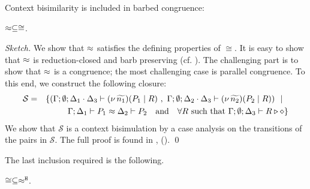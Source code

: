 Context bisimilarity is included in barbed congruence:
\begin{lemma}
	\label{lem:wbc_is_cong}
	$\approx \subseteq \cong$.
\end{lemma}

\begin{proof}[Sketch]
	We show that $\approx$ satisfies the defining
	properties of $\cong$.
	It is easy to show that $\approx$ is reduction-closed
	and barb preserving (cf. ).
		The challenging part is
	to show that $\approx$ is a congruence; the most challenging
	case is parallel congruence.
	To this end, we construct the following closure:
%
	\begin{eqnarray*}
		\mathcal{S} &=&	\set{
				(\Gamma; \emptyset; \Delta_1 \cat \Delta_3 \proves \newsp{\widetilde{n_1}}{P_1 \Par R} %
				\ ,\ 
				\Gamma; \emptyset; \Delta_2 \cat \Delta_3 \proves \newsp{\widetilde{n_2}}{P_2 \Par R})
				\setbar \\
		& &		\quad \horel{\Gamma}{\Delta_1}{P_1}{\wbc}{\Delta_2}{P_2} \quad \mbox{and} \quad
				\forall R \mbox{ such that }\Gamma; \emptyset; \Delta_3 \proves R \hastype \Proc}
	\end{eqnarray*}
%
	We show that $\mathcal{S}$ is a context bisimulation
	by  a case analysis on the transitions of the pairs in $\mathcal{S}$.
	The full proof is found  in \appref{app:sub_coinc}, 
	 ().
	\qed
\end{proof}

The last inclusion required is the following.

\begin{lemma}
	\label{lem:cong_is_wb}
	$\cong \subseteq \approx^\mathtt{H}$.
\end{lemma}

